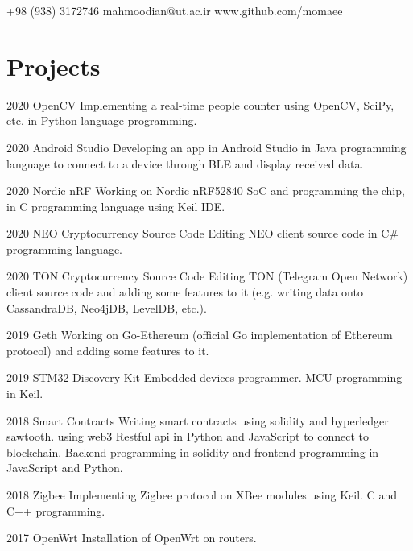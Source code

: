 \documentclass{tccv}
\begin{document}
    {+98 (938) 3172746}
    {mahmoodian@ut.ac.ir}
    {www.github.com/momaee}

\section{Projects}

\begin{yearlist}
\item{2020}
{OpenCV}
	{Implementing a real-time people counter using OpenCV, SciPy, etc. in Python language programming.}

\item{2020}
	{Android Studio}
	{Developing an app in Android Studio in Java programming language to connect to a device through BLE and display received data.}

\item{2020}
	{Nordic nRF}
	{Working on Nordic nRF52840 SoC and programming the chip, in C programming language using Keil IDE.}

\item{2020}
	{NEO Cryptocurrency Source Code}
	{Editing NEO client source code in C\# programming language.}

\item{2020}
	{TON Cryptocurrency Source Code}
	{Editing TON (Telegram Open Network) client source code and adding some features to it (e.g. writing data onto CassandraDB, Neo4jDB, LevelDB, etc.).}

\item{2019}
     {Geth}
     {Working on Go-Ethereum (official Go implementation of Ethereum protocol) and adding some features to it.}

\item{2019}
     {STM32 Discovery Kit}
     {Embedded devices programmer. MCU programming in Keil.}

\item{2018}
     {Smart Contracts}
     {Writing smart contracts using solidity and hyperledger sawtooth. using web3 Restful api in
     Python and JavaScript to connect to blockchain. Backend programming in solidity and frontend programming
     in JavaScript and Python.}

\item{2018}
     {Zigbee}
     {Implementing Zigbee protocol on XBee modules using Keil. C and C++ programming.}

\item{2017}
     {OpenWrt}
     {Installation of OpenWrt on routers.}
\end{yearlist}
\end{document}
